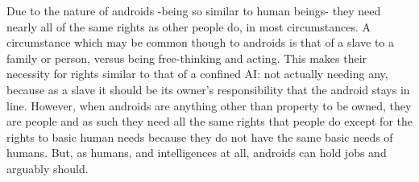 Due to the nature of androids -being so similar to human beings- they need nearly all of the same rights as other people do, in most circumstances. A circumstance which may be common though to androids is that of a slave to a family or person, versus  being free-thinking and acting. This makes their necessity for rights similar to that of a confined AI: not actually needing any, because as a slave it should be its owner's responsibility that the android stays in line. However, when androids are anything other than property to be owned, they are people and as such they need all the same rights that people do except for the rights to basic human needs because they do not have the same basic needs of humans. But, as humans, and intelligences at all, androids can hold jobs and arguably should.